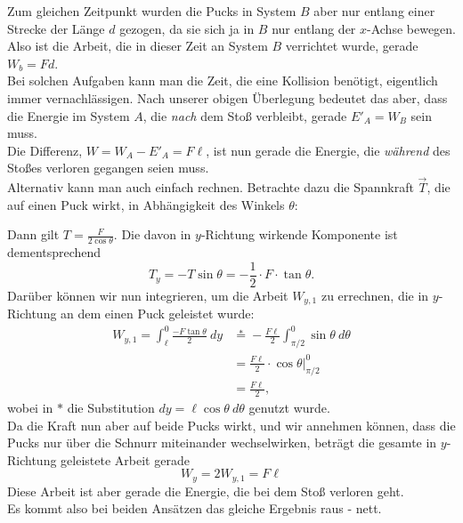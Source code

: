 \begin{Answer}[ref = pucks]
Zum gleichen Zeitpunkt wurden die Pucks in System $B$ aber nur entlang einer Strecke der Länge $d$ gezogen, da sie sich ja in $B$ nur entlang der $x$-Achse bewegen. Also ist die Arbeit, die in dieser Zeit an System $B$ verrichtet wurde, gerade $W_b = Fd$.\\
Bei solchen Aufgaben kann man die Zeit, die eine Kollision benötigt, eigentlich immer vernachlässigen. Nach unserer obigen Überlegung bedeutet das aber, dass die Energie im System $A$, die \textit{nach} dem Stoß verbleibt, gerade $E'_A = W_B$ sein muss.\\
Die Differenz, $\boxed{W = W_A-E'_A = F\ell}$, ist nun gerade die Energie, die \textit{während} des Stoßes verloren gegangen seien muss.\\
Alternativ kann man auch einfach rechnen.  Betrachte dazu die Spannkraft $\vec{T}$, die auf einen Puck wirkt, in Abhängigkeit des Winkels $\theta$:
\begin{figure}[h]
	\centering
{}
\end{figure}
Dann gilt  $T = \frac{F}{2\cos \theta}.$
Die davon in $y$-Richtung wirkende Komponente ist dementsprechend 
\begin{equation}
	T_y = -T \sin \theta = -\frac{1}{2}\cdot F\cdot \tan\theta.
\end{equation}
Darüber können wir nun integrieren, um die Arbeit $W_{y,1}$ zu errechnen, die in $y$-Richtung an dem einen Puck geleistet wurde:
\begin{align*}
	W_{y,1} = \int_{\ell}^0 \frac{-F\tan \theta}{2}~dy
	&\overset{\ast}{=} -\frac{F\ell}{2}\int_{\pi/2}^{0} \sin \theta ~d\theta\\
	&= \frac{F\ell}{2}\cdot \left. \cos \theta \right|_{\pi/2}^{0}\\
	&= \frac{F\ell}{2}, 
\end{align*}
wobei in $\ast$ die Substitution $dy = \ell \cos \theta ~d\theta$ genutzt wurde.\\
Da die Kraft nun aber auf beide Pucks wirkt, und wir annehmen können, dass die Pucks nur über die Schnurr miteinander wechselwirken, beträgt die gesamte in $y$-Richtung geleistete Arbeit gerade
\begin{equation*}
	\boxed{ W_y = 2W_{y,1} = F\ell }
\end{equation*}
Diese Arbeit ist aber gerade die Energie, die bei dem Stoß verloren geht.\\
Es kommt also bei beiden Ansätzen das gleiche Ergebnis raus - nett.

\end{Answer}